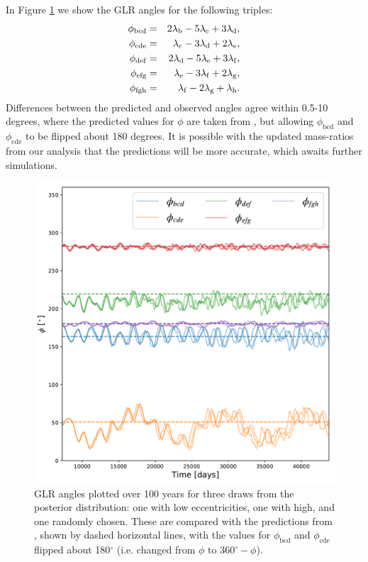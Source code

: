 \documentclass[fleqn,usenatbib]{mnras} %
\begin{document}
In Figure \ref{fig:laplace_angles} we show the GLR
angles for the following triples:
\begin{eqnarray}
\phi_\mathrm{bcd} &=& 2 \lambda_\mathrm{b} -5\lambda_\mathrm{c} + 3\lambda_\mathrm{d},\cr
\phi_\mathrm{cde} &=&  \lambda_\mathrm{c} -3\lambda_\mathrm{d} + 2\lambda_\mathrm{e},\cr
\phi_\mathrm{def} &=& 2 \lambda_\mathrm{d} -5\lambda_\mathrm{e} + 3\lambda_\mathrm{f},\cr
\phi_\mathrm{efg} &=&  \lambda_\mathrm{e} -3\lambda_\mathrm{f} + 2\lambda_\mathrm{g},\cr
\phi_\mathrm{fgh} &=&  \lambda_\mathrm{f} -2\lambda_\mathrm{g} + \lambda_\mathrm{h}.
\end{eqnarray}
Differences between the predicted and observed angles
agree within 0.5-10 degrees, where the predicted values for $\phi$ are
taken from \citet{Mah2018,Brasser2019},
but allowing $\phi_\mathrm{bcd}$ and $\phi_\mathrm{cde}$ to be flipped about 180 degrees. 
It is possible with the updated mass-ratios from
our analysis that the predictions will be more accurate, which awaits further
simulations.

\begin{figure}
    \centering
    \includegraphics[width =\hsize]{figures/Laplace_angle.pdf}
    \caption{GLR angles plotted over 100 years for
    three draws from the posterior distribution:  one with low eccentricities,
    one with high, and one randomly chosen.  These are
    compared with the predictions from \citet{Mah2018}, shown by
    dashed horizontal lines, with
    the values for $\phi_\mathrm{bcd}$ and $\phi_\mathrm{cde}$ flipped about
    180$^\circ$ (i.e. changed from $\phi$ to $360^\circ - \phi$).}
    \label{fig:laplace_angles}
\end{figure}
\end{document}
